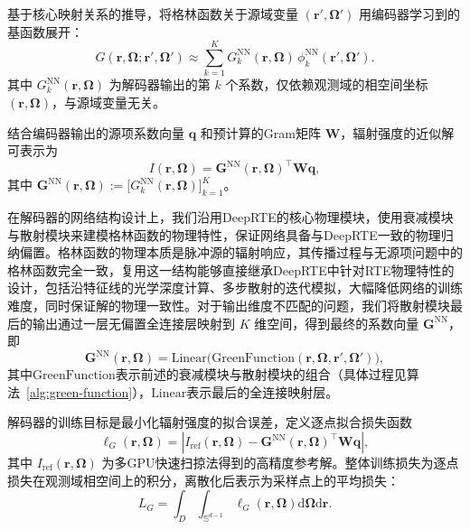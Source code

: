 基于核心映射关系的推导，将格林函数关于源域变量 $(\boldsymbol{r}',\boldsymbol{\Omega}')$ 用编码器学习到的基函数展开：
\begin{equation}
    G(\boldsymbol{r},\boldsymbol{\Omega};\boldsymbol{r}',\boldsymbol{\Omega}') \approx \sum_{k=1}^{K} G_k^{\text{NN}}(\boldsymbol{r},\boldsymbol{\Omega})\, \phi_k^{\text{NN}}(\boldsymbol{r}',\boldsymbol{\Omega}').
\end{equation}
其中 $G_k^{\text{NN}}(\boldsymbol{r},\boldsymbol{\Omega})$ 为解码器输出的第 $k$ 个系数，仅依赖观测域的相空间坐标 $(\boldsymbol{r},\boldsymbol{\Omega})$，与源域变量无关。

结合编码器输出的源项系数向量 $\boldsymbol{q}$ 和预计算的Gram矩阵 $\boldsymbol{W}$，辐射强度的近似解可表示为
\begin{equation}
    I(\boldsymbol{r},\boldsymbol{\Omega}) = \boldsymbol{G}^{\text{NN}}(\boldsymbol{r},\boldsymbol{\Omega})^{\top} \boldsymbol{W} \boldsymbol{q},
\end{equation}
其中 $\boldsymbol{G}^{\text{NN}}(\boldsymbol{r},\boldsymbol{\Omega}):=\bigl[G_k^{\text{NN}}(\boldsymbol{r},\boldsymbol{\Omega})\bigr]_{k=1}^{K}$。

在解码器的网络结构设计上，我们沿用DeepRTE的核心物理模块，使用衰减模块与散射模块来建模格林函数的物理特性，保证网络具备与DeepRTE一致的物理归纳偏置。格林函数的物理本质是脉冲源的辐射响应，其传播过程与无源项问题中的格林函数完全一致，复用这一结构能够直接继承DeepRTE中针对RTE物理特性的设计，包括沿特征线的光学深度计算、多步散射的迭代模拟，大幅降低网络的训练难度，同时保证解的物理一致性。对于输出维度不匹配的问题，我们将散射模块最后的输出通过一层无偏置全连接层映射到 $K$ 维空间，得到最终的系数向量 $\boldsymbol{G}^{\text{NN}}$，即
\begin{equation}
    \boldsymbol{G}^{\text{NN}}(\boldsymbol{r},\boldsymbol{\Omega}) = \text{Linear}\bigl(\text{GreenFunction}(\boldsymbol{r},\boldsymbol{\Omega}, \boldsymbol{r}', \boldsymbol{\Omega}')\bigr),
\end{equation}
其中$\text{GreenFunction}$表示前述的衰减模块与散射模块的组合（具体过程见算法~\ref{alg:green-function}），$\text{Linear}$表示最后的全连接映射层。

解码器的训练目标是最小化辐射强度的拟合误差，定义逐点拟合损失函数
\begin{equation}
    \ell_G(\boldsymbol{r},\boldsymbol{\Omega}) = \left| I_{\text{ref}}(\boldsymbol{r},\boldsymbol{\Omega}) - \boldsymbol{G}^{\text{NN}}(\boldsymbol{r},\boldsymbol{\Omega})^{\top} \boldsymbol{W} \boldsymbol{q} \right|,
\end{equation}
其中 $I_{\text{ref}}(\boldsymbol{r},\boldsymbol{\Omega})$ 为多GPU快速扫掠法得到的高精度参考解。整体训练损失为逐点损失在观测域相空间上的积分，离散化后表示为采样点上的平均损失：
\begin{equation}
    L_G = \int_{D}\int_{\mathbb{S}^{d-1}} \ell_G(\boldsymbol{r},\boldsymbol{\Omega})\mathrm{d}\boldsymbol{\Omega}\mathrm{d}\boldsymbol{r}.
\end{equation}

